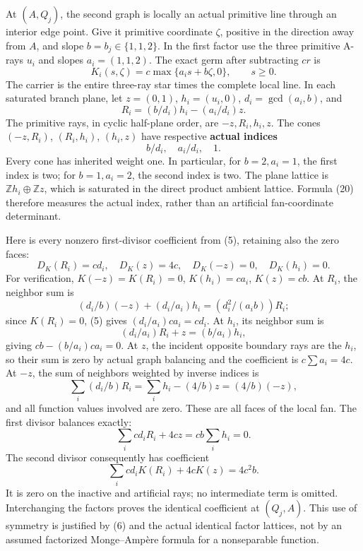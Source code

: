 \documentclass[
  10pt,
]{article}
\begin{document}
At \((A,Q_j)\), the second graph is locally an actual primitive line
through an interior edge point. Give it primitive coordinate \(\zeta\),
positive in the direction away from \(A\), and slope
\(b=b_j\in\{1,1,2\}\). In the first factor use the three primitive
A-rays \(u_i\) and slopes \(a_i=(1,1,2)\). The exact germ after
subtracting \(cr\) is \[
 K_i(s,\zeta)=c\max\{a_i s+b\zeta,0\},\qquad s\geq0.          \tag{18}
\] The carrier is the entire three-ray star times the complete local
line. In each saturated branch plane, let \(z=(0,1)\), \(h_i=(u_i,0)\),
\(d_i=\gcd(a_i,b)\), and \[
 R_i=(b/d_i)h_i-(a_i/d_i)z.                                 \tag{19}
\] The primitive rays, in cyclic half-plane order, are \(-z,R_i,h_i,z\).
The cones \((-z,R_i)\), \((R_i,h_i)\), \((h_i,z)\) have respective
\textbf{actual indices} \[
 b/d_i,\quad a_i/d_i,\quad1.                                \tag{20}
\] Every cone has inherited weight one. In particular, for
\(b=2,a_i=1\), the first index is two; for \(b=1,a_i=2\), the second
index is two. The plane lattice is \(\mathbb{Z}h_i\oplus\mathbb{Z}z\),
which is saturated in the direct product ambient lattice. Formula (20)
therefore measures the actual index, rather than an artificial
fan-coordinate determinant.

Here is every nonzero first-divisor coefficient from (5), retaining also
the zero faces: \[
 D_K(R_i)=c d_i,\quad D_K(z)=4c,\quad
 D_K(-z)=0,\quad D_K(h_i)=0.                                \tag{21}
\] For verification, \(K(-z)=K(R_i)=0\), \(K(h_i)=ca_i\), \(K(z)=cb\).
At \(R_i\), the neighbor sum is \[
 (d_i/b)(-z)+(d_i/a_i)h_i=(d_i^2/(a_ib))R_i;
\] since \(K(R_i)=0\), (5) gives \((d_i/a_i)ca_i=cd_i\). At \(h_i\), its
neighbor sum is \[
 (d_i/a_i)R_i+z=(b/a_i)h_i,
\] giving \(cb-(b/a_i)ca_i=0\). At \(z\), the incident opposite boundary
rays are the \(h_i\), so their sum is zero by actual graph balancing and
the coefficient is \(c\sum a_i=4c\). At \(-z\), the sum of neighbors
weighted by inverse indices is \[
 \sum_i(d_i/b)R_i=\sum_i h_i-(4/b)z=(4/b)(-z),
\] and all function values involved are zero. These are all faces of the
local fan. The first divisor balances exactly: \[
 \sum_i cd_iR_i+4cz=cb\sum_i h_i=0.
\] The second divisor consequently has coefficient \[
 \sum_i cd_iK(R_i)+4cK(z)=4c^2b.                            \tag{22}
\] It is zero on the inactive and artificial rays; no intermediate term
is omitted. Interchanging the factors proves the identical coefficient
at \((Q_j,A)\). This use of symmetry is justified by (6) and the actual
identical factor lattices, not by an assumed factorized Monge--Ampère
formula for a nonseparable function.
\end{document}
